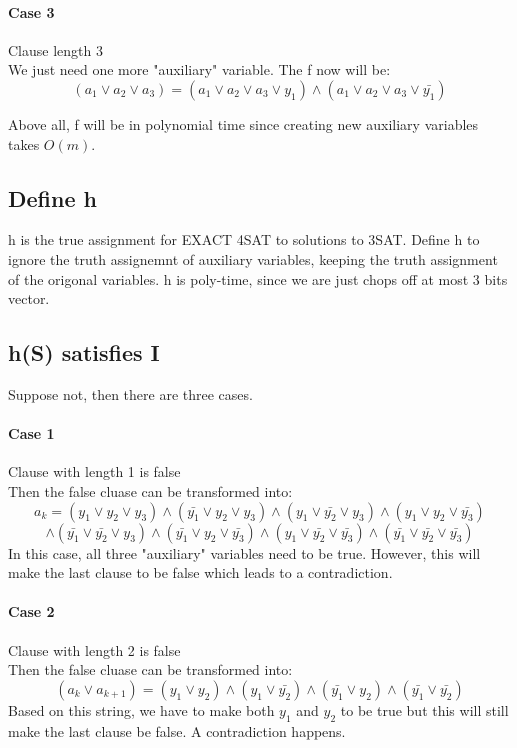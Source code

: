 \documentclass{article}
\begin{document}
\paragraph*{Case 3} Clause length 3\\
We just need one more "auxiliary" variable. The f now will be:
$$(a_1 \vee a_2 \vee a_3) = (a_1 \vee a_2 \vee a_3 \vee y_1) \wedge (a_1 \vee a_2 \vee a_3 \vee \bar{y_1})$$


Above all, f will be in polynomial time since creating new auxiliary variables takes $O(m)$.

\subsection*{Define h}
h is the true assignment for EXACT 4SAT to solutions to 3SAT. Define h to ignore the truth assignemnt 
of auxiliary variables, keeping the truth assignment of the origonal variables. h is poly-time,
since we are just chops off at most 3 bits vector.


\subsection*{h(S) satisfies I}
Suppose not, then there are three cases.
\paragraph*{Case 1} Clause with length 1 is false \\
Then the false cluase can be transformed into:
$$a_k = (y_1 \vee y_2 \vee y_3) \wedge (\bar{y_1} \vee y_2 \vee y_3) \wedge (y_1 \vee \bar{y_2} \vee y_3) \wedge (y_1 \vee y_2 \vee \bar{y_3})$$
$$\wedge (\bar{y_1} \vee \bar{y_2} \vee y_3) \wedge (\bar{y_1} \vee y_2 \vee \bar{y_3}) \wedge (y_1 \vee \bar{y_2} \vee \bar{y_3}) \wedge (\bar{y_1} \vee \bar{y_2} \vee \bar{y_3}) $$
In this case, all three "auxiliary" variables need to be true. However, this will make the last clause to be false which leads to a contradiction.

\paragraph*{Case 2} Clause with length 2 is false \\
Then the false cluase can be transformed into:
$$(a_k \vee a_{k+1}) = (y_1 \vee y_2) \wedge (y_1 \vee \bar{y_2}) \wedge (\bar{y_1} \vee y_2) \wedge (\bar{y_1} \vee \bar{y_2})$$
Based on this string, we have to make both $y_1$ and $y_2$ to be true but this will still make the last clause be false. A contradiction happens.
\end{document}

